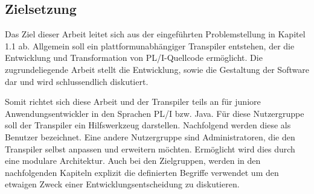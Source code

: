 \pagebreak
     




% 	 
%	 
%
    
\subsection{Zielsetzung}
Das Ziel dieser Arbeit leitet sich aus der eingeführten Problemstellung in Kapitel 1.1 ab. Allgemein soll ein plattformunabhängiger Transpiler entstehen, der die  Entwicklung und Transformation von PL/I-Quellcode ermöglicht. Die zugrundeliegende Arbeit stellt die Entwicklung, sowie die Gestaltung der Software dar und wird schlussendlich diskutiert. 

Somit richtet sich diese Arbeit und der Transpiler teils an für juniore Anwendungsentwickler in den Sprachen PL/I bzw. Java. Für diese Nutzergruppe soll der Transpiler ein Hilfswerkzeug darstellen. Nachfolgend werden diese als Benutzer bezeichnet. Eine andere Nutzergruppe sind Administratoren, die den Transpiler selbst anpassen und erweitern möchten. Ermöglicht wird dies durch eine modulare Architektur. Auch bei den Zielgruppen, werden in den nachfolgenden Kapiteln explizit die definierten Begriffe verwendet um den etwaigen Zweck einer Entwicklungsentscheidung zu diskutieren.
	
